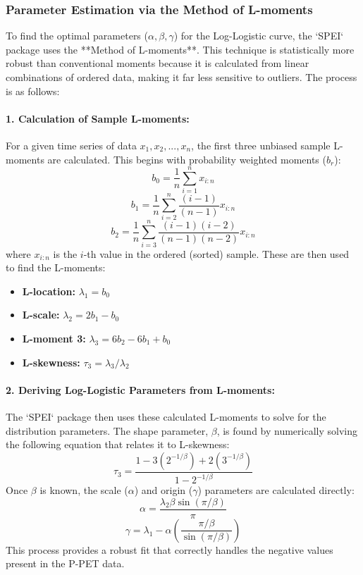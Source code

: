 \documentclass[12pt, a4paper]{article}
\begin{document}
\subsubsection{Parameter Estimation via the Method of L-moments}
To find the optimal parameters ($\alpha, \beta, \gamma$) for the Log-Logistic curve, the `SPEI` package uses the **Method of L-moments**. This technique is statistically more robust than conventional moments because it is calculated from linear combinations of ordered data, making it far less sensitive to outliers. The process is as follows:

\paragraph{1. Calculation of Sample L-moments:}
For a given time series of data $x_1, x_2, ..., x_n$, the first three unbiased sample L-moments are calculated. This begins with probability weighted moments ($b_r$):
\[ b_0 = \frac{1}{n} \sum_{i=1}^{n} x_{i:n} \]
\[ b_1 = \frac{1}{n} \sum_{i=2}^{n} \frac{(i-1)}{(n-1)} x_{i:n} \]
\[ b_2 = \frac{1}{n} \sum_{i=3}^{n} \frac{(i-1)(i-2)}{(n-1)(n-2)} x_{i:n} \]
where $x_{i:n}$ is the $i$-th value in the ordered (sorted) sample. These are then used to find the L-moments:
\begin{itemize}
    \item \textbf{L-location:} $\lambda_1 = b_0$
    \item \textbf{L-scale:} $\lambda_2 = 2b_1 - b_0$
    \item \textbf{L-moment 3:} $\lambda_3 = 6b_2 - 6b_1 + b_0$
    \item \textbf{L-skewness:} $\tau_3 = \lambda_3 / \lambda_2$
\end{itemize}

\paragraph{2. Deriving Log-Logistic Parameters from L-moments:}
The `SPEI` package then uses these calculated L-moments to solve for the distribution parameters. The shape parameter, $\beta$, is found by numerically solving the following equation that relates it to L-skewness:
\[ \tau_3 = \frac{1 - 3(2^{-1/\beta}) + 2(3^{-1/\beta})}{1 - 2^{-1/\beta}} \]
Once $\beta$ is known, the scale ($\alpha$) and origin ($\gamma$) parameters are calculated directly:
\[ \alpha = \frac{\lambda_2 \beta \sin(\pi/\beta)}{\pi} \]
\[ \gamma = \lambda_1 - \alpha \left(\frac{\pi/\beta}{\sin(\pi/\beta)}\right) \]
This process provides a robust fit that correctly handles the negative values present in the P-PET data.
\end{document}
